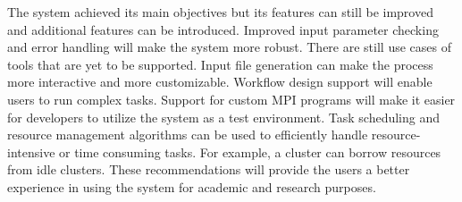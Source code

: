 The system achieved its main objectives but its features can still be improved and additional features can be introduced. Improved input parameter checking and error handling will make the system more robust. There are still use cases of tools that are yet to be supported. Input file generation can make the process more interactive and more customizable.  Workflow design support will enable users to run complex tasks. Support for custom MPI programs will make it easier for developers to utilize the system as a test environment. Task scheduling and resource management algorithms can be used to efficiently handle resource-intensive or time consuming tasks. For example, a cluster can borrow resources from idle clusters. These recommendations will provide the users a better experience in using the system for academic and research purposes. 








